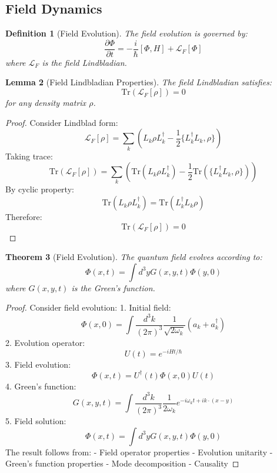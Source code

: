 \documentclass[12pt]{article}
\newcommand{\tr}{\text{Tr}}
\newtheorem{theorem}{Theorem}[section]
\newtheorem{lemma}[theorem]{Lemma}
\newtheorem{definition}[theorem]{Definition}
\begin{document}
\subsection{Field Dynamics}
\begin{definition}[Field Evolution]
The field evolution is governed by:
\begin{equation}
\frac{\partial\Phi}{\partial t} = -\frac{i}{\hbar}[\Phi,H] + \mathcal{L}_F[\Phi]
\end{equation}
where $\mathcal{L}_F$ is the field Lindbladian.
\end{definition}
\begin{lemma}[Field Lindbladian Properties]
The field Lindbladian satisfies:
\begin{equation}
\tr(\mathcal{L}_F[\rho]) = 0
\end{equation}
for any density matrix $\rho$.
\end{lemma}
\begin{proof}
Consider Lindblad form:
\begin{equation}
\mathcal{L}_F[\rho] = \sum_k(L_k\rho L_k^\dagger - \frac{1}{2}\{L_k^\dagger L_k,\rho\})
\end{equation}
Taking trace:
\begin{equation}
\tr(\mathcal{L}_F[\rho]) = \sum_k(\tr(L_k\rho L_k^\dagger) - \frac{1}{2}\tr(\{L_k^\dagger L_k,\rho\}))
\end{equation}
By cyclic property:
\begin{equation}
\tr(L_k\rho L_k^\dagger) = \tr(L_k^\dagger L_k\rho)
\end{equation}
Therefore:
\begin{equation}
\tr(\mathcal{L}_F[\rho]) = 0
\end{equation}
\end{proof}
\begin{theorem}[Field Evolution]
The quantum field evolves according to:
\begin{equation}
\Phi(x,t) = \int d^3y G(x,y,t)\Phi(y,0)
\end{equation}
where $G(x,y,t)$ is the Green's function.
\end{theorem}
\begin{proof}
Consider field evolution:
1. Initial field:
\begin{equation}
\Phi(x,0) = \int\frac{d^3k}{(2\pi)^3}\frac{1}{\sqrt{2\omega_k}}(a_k + a_k^\dagger)
\end{equation}
2. Evolution operator:
\begin{equation}
U(t) = e^{-iHt/\hbar}
\end{equation}
3. Field evolution:
\begin{equation}
\Phi(x,t) = U^\dagger(t)\Phi(x,0)U(t)
\end{equation}
4. Green's function:
\begin{equation}
G(x,y,t) = \int\frac{d^3k}{(2\pi)^3}\frac{1}{2\omega_k}e^{-i\omega_kt+ik\cdot(x-y)}
\end{equation}
5. Field solution:
\begin{equation}
\Phi(x,t) = \int d^3y G(x,y,t)\Phi(y,0)
\end{equation}
The result follows from:
- Field operator properties
- Evolution unitarity
- Green's function properties
- Mode decomposition
- Causality
\end{proof}
\end{document}
